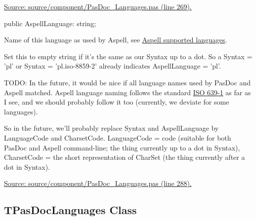 \documentclass{report}
\newif\ifpdf
\begin{document}
\begin{list}{}
\begin{flushleft}
\ifpdf
\end{flushleft}
\fi


\par  \par
\href{https://github.com/pasdoc/pasdoc/blob/master/source/component/PasDoc_Languages.pas#L269}{Source: source/component/PasDoc{\_}Languages.pas (line 269).}\label{PasDoc_Languages.TLanguageRecord-AspellLanguage}
\item[\textbf{AspellLanguage}\hfill]
\ifpdf
\begin{flushleft}
\fi
\begin{ttfamily}
public AspellLanguage: string;\end{ttfamily}

\ifpdf
\end{flushleft}
\fi


\par Name of this language as used by Aspell, see \href{http://aspell.net/man-html/Supported.html}{Aspell supported languages}.

Set this to empty string if it's the same as our Syntax up to a dot. So a Syntax = 'pl' or Syntax = 'pl.iso{-}8859{-}2' already indicates AspellLanguage = 'pl'.

TODO: In the future, it would be nice if all language names used by PasDoc and Aspell matched. Aspell language naming follows the standard \href{http://en.wikipedia.org/wiki/ISO_639-1}{ISO 639-1} as far as I see, and we should probably follow it too (currently, we deviate for some languages).

So in the future, we'll probably replace Syntax and AspellLanguage by LanguageCode and CharsetCode. LanguageCode = code (suitable for both PasDoc and Aspell command{-}line; the thing currently up to a dot in Syntax), CharsetCode = the short representation of CharSet (the thing currently after a dot in Syntax).\par
\href{https://github.com/pasdoc/pasdoc/blob/master/source/component/PasDoc_Languages.pas#L288}{Source: source/component/PasDoc{\_}Languages.pas (line 288).}\end{list}
\ifpdf
\subsection*{\large{\textbf{TPasDocLanguages Class}}\normalsize\hspace{1ex}\hrulefill}
\else
\subsection*{TPasDocLanguages Class}
\fi
\label{PasDoc_Languages.TPasDocLanguages}
\end{document}
